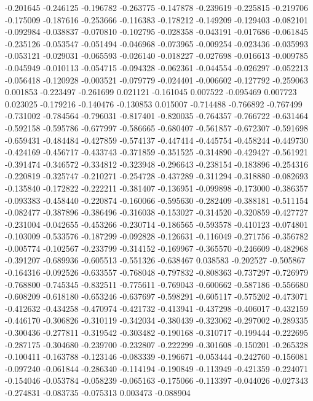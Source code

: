 -0.201645
-0.246125
-0.196782
-0.263775
-0.147878
-0.239619
-0.225815
-0.219706
-0.175009
-0.187616
-0.253666
-0.116383
-0.178212
-0.149209
-0.129403
-0.082101
-0.092984
-0.038837
-0.070810
-0.102795
-0.028358
-0.043191
-0.017686
-0.061845
-0.235126
-0.053547
-0.051494
-0.046968
-0.073965
-0.009254
-0.023436
-0.035993
-0.053121
-0.029031
-0.065593
-0.026140
-0.018227
-0.027698
-0.016613
-0.009785
-0.045949
-0.010113
-0.054715
-0.094328
-0.062361
-0.044554
-0.026297
-0.052213
-0.056418
-0.120928
-0.003521
-0.079779
-0.024401
-0.006602
-0.127792
-0.259063
0.001853
-0.223497
-0.261699
0.021121
-0.161045
0.007522
-0.095469
0.007723
0.023025
-0.179216
-0.140476
-0.130853
0.015007
-0.714488
-0.766892
-0.767499
-0.731002
-0.784564
-0.796031
-0.817401
-0.820035
-0.764357
-0.766722
-0.631464
-0.592158
-0.595786
-0.677997
-0.586665
-0.680407
-0.561857
-0.672307
-0.591698
-0.659431
-0.484484
-0.427859
-0.574137
-0.447414
-0.445754
-0.458244
-0.449730
-0.424169
-0.456717
-0.433743
-0.371859
-0.351525
-0.314890
-0.429427
-0.561921
-0.391474
-0.346572
-0.334812
-0.323948
-0.296643
-0.238154
-0.183896
-0.254316
-0.220819
-0.325747
-0.210271
-0.254728
-0.437289
-0.311294
-0.318880
-0.082693
-0.135840
-0.172822
-0.222211
-0.381407
-0.136951
-0.099898
-0.173000
-0.386357
-0.093383
-0.458440
-0.220874
-0.160066
-0.595630
-0.282409
-0.388181
-0.511154
-0.082477
-0.387896
-0.386496
-0.316038
-0.153027
-0.314520
-0.320859
-0.427727
-0.231004
-0.042655
-0.453266
-0.230714
-0.186565
-0.593578
-0.410123
-0.074801
-0.103009
-0.533576
-0.187299
-0.092828
-0.126631
-0.116049
-0.271756
-0.356782
-0.005774
-0.102567
-0.233799
-0.314152
-0.169967
-0.365570
-0.246609
-0.482968
-0.391207
-0.689936
-0.605513
-0.551326
-0.638467
0.038583
-0.202527
-0.505867
-0.164316
-0.092526
-0.633557
-0.768048
-0.797832
-0.808363
-0.737297
-0.726979
-0.768800
-0.745345
-0.832511
-0.775611
-0.769043
-0.600662
-0.587186
-0.556680
-0.608209
-0.618180
-0.653246
-0.637697
-0.598291
-0.605117
-0.575202
-0.473071
-0.412632
-0.434258
-0.470974
-0.421732
-0.413941
-0.437298
-0.406017
-0.432159
-0.446170
-0.306826
-0.310119
-0.342034
-0.380439
-0.323062
-0.297002
-0.289335
-0.300436
-0.277811
-0.319542
-0.303482
-0.190168
-0.310717
-0.199444
-0.222695
-0.287175
-0.304680
-0.239700
-0.232807
-0.222299
-0.301608
-0.150201
-0.265328
-0.100411
-0.163788
-0.123146
-0.083339
-0.196671
-0.053444
-0.242760
-0.156081
-0.097240
-0.061844
-0.286340
-0.114194
-0.190849
-0.113949
-0.421359
-0.224071
-0.154046
-0.053784
-0.058239
-0.065163
-0.175066
-0.113397
-0.044026
-0.027343
-0.274831
-0.083735
-0.075313
0.003473
-0.088904
